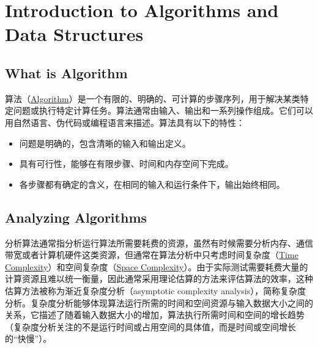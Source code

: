 \chapter{Introduction to Algorithms and Data Structures}
\section{What is Algorithm}
算法（\href{https://en.wikipedia.org/wiki/Algorithm}{Algorithm}）是一个有限的、明确的、可计算的步骤序列，用于解决某类特定问题或执行特定计算任务\cite{cormenIntroductionAlgorithms2009}。算法通常由输入、输出和一系列操作组成。它们可以用自然语言、伪代码或编程语言来描述。算法具有以下的特性：

\begin{itemize}
    \item 问题是明确的，包含清晰的输入和输出定义。
    \item 具有可行性，能够在有限步骤、时间和内存空间下完成。
    \item 各步骤都有确定的含义，在相同的输入和运行条件下，输出始终相同。
\end{itemize}

\section{Analyzing Algorithms}
分析算法通常指分析运行算法所需要耗费的资源，虽然有时候需要分析内存、通信带宽或者计算机硬件这类资源，但通常在算法分析中只考虑时间复杂度（\href{https://www.wikiwand.com/en/articles/Time_complexity}{Time Complexity}）和空间复杂度（\href{https://www.wikiwand.com/en/articles/Space_complexity}{Space Complexity}）。由于实际测试需要耗费大量的计算资源且难以统一衡量，因此通常采用理论估算的方法来评估算法的效率，这种估算方法被称为渐近复杂度分析（asymptotic complexity analysis），简称复杂度分析。复杂度分析能够体现算法运行所需的时间和空间资源与输入数据大小之间的关系，它描述了随着输入数据大小的增加，算法执行所需时间和空间的增长趋势（复杂度分析关注的不是运行时间或占用空间的具体值，而是时间或空间增长的“快慢”）。

